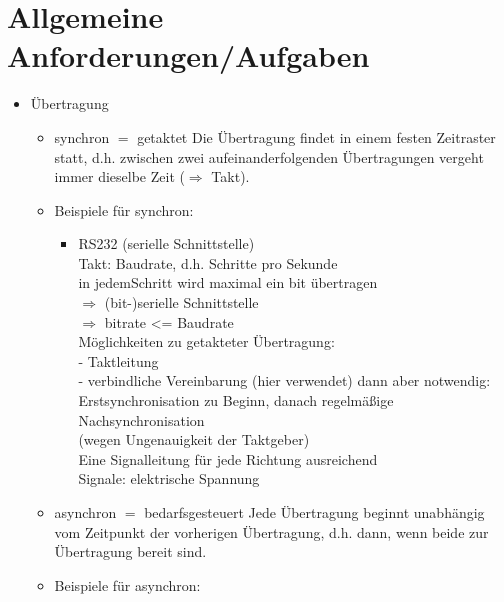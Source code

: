\section{Allgemeine Anforderungen/Aufgaben}
\begin{itemize}
\item Übertragung
\begin{itemize}
\item synchron $=$ getaktet
Die Übertragung findet in einem festen Zeitraster statt, d.h. zwischen zwei aufeinanderfolgenden Übertragungen vergeht immer dieselbe Zeit ($\Rightarrow$ Takt).
\item Beispiele für synchron:
\begin{itemize}
\item  RS232 (serielle Schnittstelle)\\
Takt: Baudrate, d.h. Schritte pro Sekunde\\
in jedemSchritt wird maximal ein bit übertragen\\
$\Rightarrow$ (bit-)serielle Schnittstelle\\
$\Rightarrow$ bitrate <= Baudrate\\
Möglichkeiten zu getakteter Übertragung:\\
- Taktleitung\\
- verbindliche Vereinbarung (hier verwendet) dann aber notwendig:\\ Erstsynchronisation zu Beginn, danach regelmäßige Nachsynchronisation\\ (wegen Ungenauigkeit der Taktgeber)\\
Eine Signalleitung für jede Richtung ausreichend\\
Signale: elektrische Spannung

\end{itemize}
\item asynchron $=$ bedarfsgesteuert
Jede Übertragung beginnt unabhängig vom Zeitpunkt der vorherigen Übertragung, d.h. dann, wenn beide zur Übertragung bereit sind.
\item Beispiele für asynchron:

	\end{itemize}
\end{itemize}